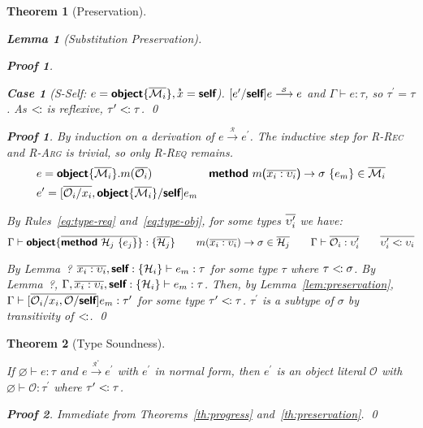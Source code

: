 \documentclass[a4paper, 11pt]{article}
\def\H{\mathcal{H}}
\def\M{\mathcal{M}}
\def\O{\mathcal{O}}
\def\G{\Gamma}
\newcommand{\ctx}[3]{#1 \vdash #2 : #3}
\newcommand{\gctx}[2]{\ctx{\G}{#1}{#2}}
\def\sub{<\kern-1pt:}
\def\bo{{\sffamily\upshape\{}}
\def\bc{{\sffamily\upshape\}}}
\def\po{{\sffamily\upshape(}}
\def\pc{{\sffamily\upshape)}}
\newcommand{\key}[1]{{\sffamily\bfseries#1}}
\newcommand{\object}[1]{\text{\key{object}\bo}#1\text{\bc}}
\newcommand{\methh}[2]{\text{\key{method} }#1\ \text{\bo}#2\text{\bc}}
\newcommand{\method}[4]{\methh{#1\text{\po}#2\text{\pc }\to #3}{#4}}
\newcommand{\type}[1]{\text{\bo}#1\text{\bc}}
\newcommand{\self}{\text{\key{self}}}
\def\rto{\overset{_\mathcal{R}}\longrightarrow}
\def\rtot{\overset{_{\mathcal{R}^*}}{\longrightarrow}}
\def\sto{\overset{_\mathcal{S}}\longrightarrow}
\def\xs{\overset{_\text{\sffamily\bfseries s}}x}
\theoremstyle{theorem}
\newtheorem{theorem}{Theorem}
\theoremstyle{lemma}
\newtheorem{lemma}{Lemma}[theorem]
\theoremstyle{tproof}
\newtheorem*{tproof}{Proof}
\theoremstyle{lproof}
\newtheorem*{lproof}{Proof}
\theoremstyle{tcase}
\theoremstyle{lcase}
\newtheorem*{lcase}{Case}
\begin{document}
\begin{theorem}[Preservation]
\begin{lemma}[Substitution Preservation]
\begin{lproof}
\begin{lcase}[S-Self: $e = \object{\*\M_i*}, \xs = \self$]
$[e^\prime/\self]e \sto e$ and $\gctx{e}{\tau}$, so
$\tau^\prime = \tau$.  As $\sub$ is reflexive, $\tau^\prime \sub \tau$. \qed
\end{lcase}

\end{lproof}

\end{lemma}

\begin{tproof}

By induction on a derivation of $e \rto e^\prime$.  The inductive step for
\textsc{R-Rec} and \textsc{R-Arg} is trivial, so only \textsc{R-Req} remains.
\begin{align*}
&e = \object{\*\M_i*}.m(\*\O_i*) &
\method{m}{\*x_i : \upsilon_i*}{\sigma}{e_m} \in \*\M_i* \\
&e^\prime = [\*\O_i/x_i*, \object{\*\M_i*}/\self]e_m &
\end{align*}

\noindent By Rules~\ref{eq:type-req} and~\ref{eq:type-obj}, for some types
$\*\upsilon^\prime_i*$ we have:
\begin{displaymath}
\G \vdash \object{\*\methh{\H_j}{e_j}*} : \type{\*\H_j*} \quad\quad
m(\*x_i : \upsilon_i*) \to \sigma \in \*\H_j* \quad\quad
\G \vdash \*\O_i : \upsilon^\prime_i* \quad\quad
\*\upsilon^\prime_i \sub \upsilon_i*
\end{displaymath}

\noindent By Lemma~?
$\*x_i : \upsilon_i*, \self : \type{\H_i} \vdash e_m : \tau$ for some type
$\tau$ where $\tau \sub \sigma$.  By Lemma~?,
$\G, \*x_i : \upsilon_i*, \self : \type{\H_i} \vdash e_m : \tau$.  Then, by
Lemma~\ref{lem:preservation},
$\G \vdash [\*\O_i/x_i,\O/\self*]e_m : \tau^\prime$ for some type
$\tau^\prime \sub \tau$.  $\tau^\prime$ is a subtype of $\sigma$ by transitivity
of $\sub$. \qed

\end{tproof}

\end{theorem}

\begin{theorem}[Type Soundness]
\label{th:type-soundness}

If $\varnothing \vdash e : \tau$ and $e \rtot e^\prime$ with $e^\prime$ in
normal form, then $e^\prime$ is an object literal $\O$ with
$\varnothing \vdash \O : \tau^\prime$ where $\tau^\prime \sub \tau$.

\begin{tproof}
Immediate from Theorems~\ref{th:progress} and~\ref{th:preservation}. \qed
\end{tproof}

\end{theorem}



\end{document}
